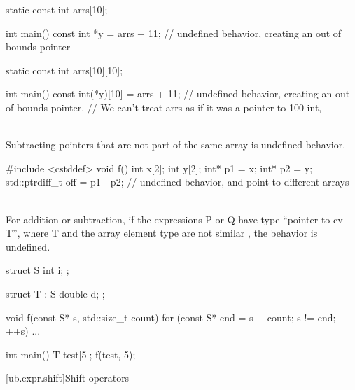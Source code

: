 \pnum
\begin{example}
\begin{codeblock}
static const int arrs[10]{};

int main() {
  const int *y = arrs + 11;             // undefined behavior, creating an out of bounds pointer
}
\end{codeblock}
\end{example}

\begin{example}
\begin{codeblock}
static const int arrs[10][10]{};

int main() {
  const int(*y)[10] = arrs + 11;        // undefined behavior, creating an out of bounds pointer.
                                        // We can't treat arrs as-if it was a pointer to 100 int,
}
\end{codeblock}
\end{example}

\pnum
{} \\
Subtracting pointers that are not part of the same array is undefined behavior.

\pnum
\begin{example}
\begin{codeblock}
#include <cstddef>
void f() {
  int x[2];
  int y[2];
  int* p1 = x;
  int* p2 = y;
  std::ptrdiff_t off = p1 - p2; // undefined behavior,  and  point to different arrays
}
\end{codeblock}
\end{example}

\pnum
{} \\
For addition or subtraction, if the expressions P or Q have type ``pointer to cv T'', where T and the array
element type are not similar , the behavior is undefined.

\pnum
\begin{example}
\begin{codeblock}
struct S {
  int i;
};

struct T : S {
  double d;
};

void f(const S* s, std::size_t count) {
  for (const S* end = s + count; s != end; ++s) {
    ...
  }
}

int main() {
  T test[5];
  f(test, 5);
}
\end{codeblock}
\end{example}


[ub.expr.shift]{Shift operators}

